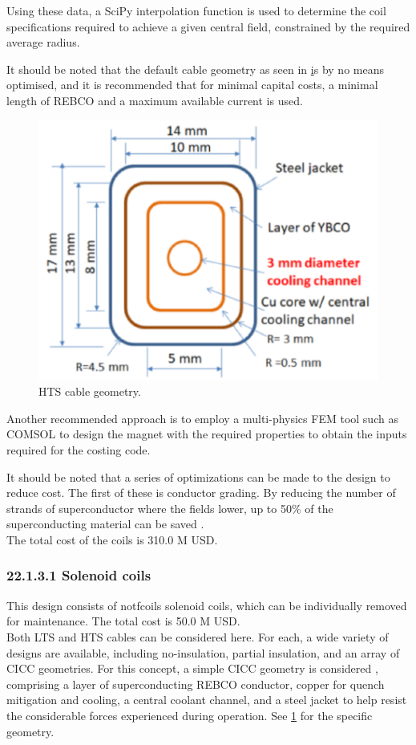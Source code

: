 Using these data, a SciPy interpolation function is used to determine the coil specifications required to achieve a given central field, constrained by the required average radius.

It should be noted that the default cable geometry as seen in \href{fig:yuhu_cs} is by no means optimised, and it is recommended that for minimal capital costs, a minimal length of REBCO and a maximum available current is used.


\begin{figure}[h]
    \centering
    \includegraphics[width =0.5\linewidth]{StandardFigures/yuhu_cs.pdf}
    \caption{HTS cable geometry.}
    \label{fig:yuhu_cs}
\end{figure}

Another recommended approach is to employ a multi-physics FEM tool such as COMSOL to design the magnet with the required properties to obtain the inputs required for the costing code.

It should be noted that a series of optimizations can be made to the design to reduce cost. The first of these is conductor grading. By reducing the number of strands of superconductor where the fields lower, up to 50\% of the superconducting material can be saved \cite{uglietti2018progressing}.\\

The total cost of the coils is 310.0 M USD.


\subsubsection*{22.1.3.1 Solenoid coils}

This design consists of notfcoils solenoid coils, which can be individually removed for maintenance. The total cost is 50.0 M USD.\\

Both LTS and HTS cables can be considered here. For each, a wide variety of designs are available, including no-insulation, partial insulation, and an array of CICC geometries. For this concept, a simple CICC geometry is considered \cite{Menard2016}, comprising a layer of superconducting REBCO conductor, copper for quench mitigation and cooling, a central coolant channel, and a steel jacket to help resist the considerable forces experienced during operation. See \ref{fig:yuhu_cs} for the specific geometry.\\

